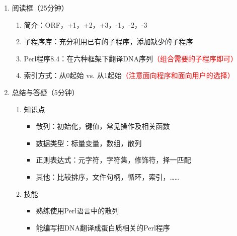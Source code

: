 \documentclass{TIJMUjiaoanLL}
\begin{document}
\begin{enumerate}
\begin{enumerate}
    \end{enumerate}
  \item 阅读框（25分钟）
    \begin{enumerate}
      \item 简介：ORF，+1，+2，+3，-1，-2，-3
      \item 子程序库：充分利用已有的子程序，添加缺少的子程序
      \item Perl程序8.4：在六种框架下翻译DNA序列\textcolor{red}{（组合需要的子程序即可）}
      \item 索引方式：从0起始 vs.  从1起始\textcolor{red}{（注意面向程序和面向用户的选择）}
    \end{enumerate}

\otherTail
\newpage
\otherHeader

  \item 总结与答疑（5分钟）
    \begin{enumerate}
      \item 知识点
	\begin{itemize}
	  \item 散列：初始化，键值，常见操作及相关函数
	  \item 数据类型：标量变量，数组，散列
	  \item 正则表达式：元字符，字符集，修饰符，择一匹配
	  \item 其他：比较排序，文件句柄，循环，索引，……
	\end{itemize}
      \item 技能
	\begin{itemize}
	  \item 熟练使用Perl语言中的散列
	  \item 能编写把DNA翻译成蛋白质相关的Perl程序
	\end{itemize}
    \end{enumerate}
\end{enumerate}

\otherTail
\end{document}
